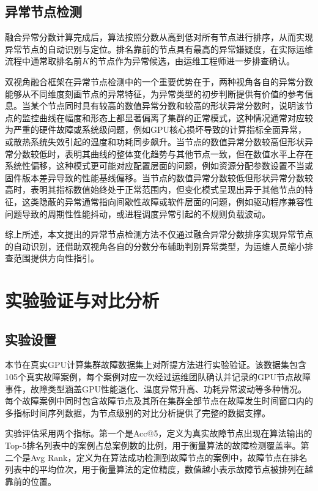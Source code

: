 \subsection{异常节点检测}

融合异常分数计算完成后，算法按照分数从高到低对所有节点进行排序，从而实现异常节点的自动识别与定位。排名靠前的节点具有最高的异常嫌疑度，在实际运维流程中通常取排名前$K$的节点作为异常候选，由运维工程师进一步排查确认。

双视角融合框架在异常节点检测中的一个重要优势在于，两种视角各自的异常分数能够从不同维度刻画节点的异常特征，为异常类型的初步判断提供有价值的参考信息。当某个节点同时具有较高的数值异常分数和较高的形状异常分数时，说明该节点的监控曲线在幅度和形态上都显著偏离了集群的正常模式，这种情况通常对应较为严重的硬件故障或系统级问题，例如GPU核心损坏导致的计算指标全面异常，或散热系统失效引起的温度和功耗同步飙升。当节点的数值异常分数较高但形状异常分数较低时，表明其曲线的整体变化趋势与其他节点一致，但在数值水平上存在系统性偏移，这种模式更可能对应配置层面的问题，例如资源分配参数设置不当或固件版本差异导致的性能基线偏移。当节点的数值异常分数较低但形状异常分数较高时，表明其指标数值始终处于正常范围内，但变化模式呈现出异于其他节点的特征，这类隐蔽的异常通常指向间歇性故障或软件层面的问题，例如驱动程序兼容性问题导致的周期性性能抖动，或进程调度异常引起的不规则负载波动。

综上所述，本文提出的异常节点检测方法不仅通过融合异常分数排序实现异常节点的自动识别，还借助双视角各自的分数分布辅助判别异常类型，为运维人员缩小排查范围提供方向性指引。

\section{实验验证与对比分析}

\subsection{实验设置}

本节在真实GPU计算集群故障数据集上对所提方法进行实验验证。该数据集包含105个真实故障案例，每个案例对应一次经过运维团队确认并记录的GPU节点故障事件，故障类型涵盖GPU性能退化、温度异常升高、功耗异常波动等多种情况。每个故障案例中同时包含故障节点及其所在集群全部节点在故障发生时间窗口内的多指标时间序列数据，为节点级别的对比分析提供了完整的数据支撑。

实验评估采用两个指标。第一个是Acc@5，定义为真实故障节点出现在算法输出的Top-5排名列表中的案例占总案例数的比例，用于衡量算法的故障检测覆盖率。第二个是Avg Rank，定义为在算法成功检测到故障节点的案例中，故障节点在排名列表中的平均位次，用于衡量算法的定位精度，数值越小表示故障节点被排列在越靠前的位置。

